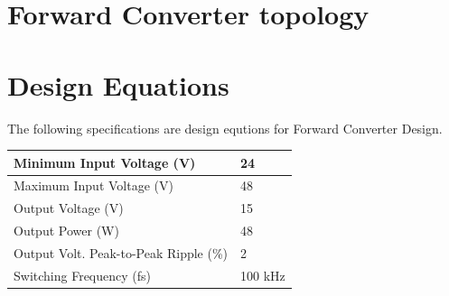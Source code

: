 \documentclass{article}
\begin{document}
\section{Forward Converter topology}
\section{Design Equations}
The following specifications are design equtions for Forward Converter Design.
\begin{table}
    \centering
\begin{tabular}{|l|l|}
    \hline
    Minimum Input Voltage (V)             & 24      \\ \hline
    Maximum Input Voltage (V)             & 48      \\ \hline
    Output Voltage (V)                    & 15      \\ \hline
    Output Power (W)                      & 48      \\ \hline
    Output Volt. Peak-to-Peak Ripple (\%) & 2       \\ \hline
    Switching Frequency (fs)              & 100 kHz \\ \hline
\end{tabular}
\end{table}
\end{document}

